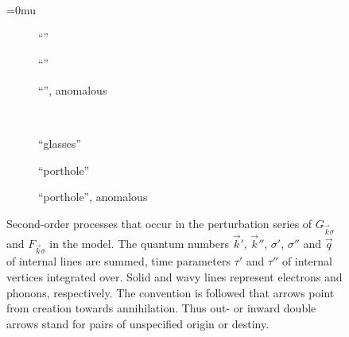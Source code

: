 \begin{figure}
    \small
    \medmuskip=0mu
    \begin{subfigure}[b]{\linewidth/3}
        \centering
        
        \caption{``''}
        \label{Hartree}
    \end{subfigure}%
    \begin{subfigure}[b]{\linewidth/3}
        \centering
        
        \caption{``''}
        \label{Fock}
    \end{subfigure}%
    \begin{subfigure}[b]{\linewidth/3}
        \centering
        
        \caption{``'', anomalous}
        \label{Fock, anomalous}
    \end{subfigure}\\[1cm]
    \begin{subfigure}[b]{\linewidth/3}
        \centering
        
        \caption{``glasses''}
        \label{glasses}
    \end{subfigure}%
    \begin{subfigure}[b]{\linewidth/3}
        \centering
        
        \caption{``porthole''}
        \label{porthole}
    \end{subfigure}%
    \begin{subfigure}[b]{\linewidth/3}
        \centering
        
        \caption{``porthole'', anomalous}
        \label{porthole, anomalous}
    \end{subfigure}
    \caption[ diagrams for electron-phonon interaction]
        {Second-order processes that occur in the 
         perturbation series of $G_{\vec k \sigma}$ and $F_{\vec k \sigma}$ in
         the  model. The quantum numbers $\vec k'$, $\vec k''$,
         $\sigma'$, $\sigma''$ and $\vec q$ of internal lines are summed, time
         parameters $\tau'$ and $\tau''$ of internal vertices integrated over.
         Solid and wavy lines represent electrons and phonons, respectively. The
         convention is followed that arrows point from creation towards
         annihilation. Thus out- or inward double arrows stand for 
         pairs of unspecified origin or destiny.}
    \label{Feynman diagrams}
\end{figure}

